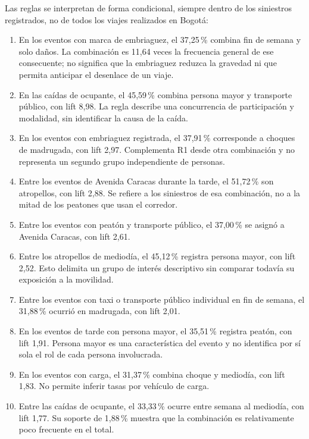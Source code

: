\documentclass[12pt,letterpaper]{article}
\begin{document}
Las reglas se interpretan de forma condicional, siempre dentro de los
siniestros registrados, no de todos los viajes realizados en Bogotá:
\begin{enumerate}[label=\textbf{R\arabic*.},leftmargin=*,itemsep=5pt]
\item En los eventos con marca de embriaguez, el 37,25\,\% combina
fin de semana y solo daños. La combinación es 11,64 veces la frecuencia
general de ese consecuente; no significa que la embriaguez reduzca la
gravedad ni que permita anticipar el desenlace de un viaje.
\item En las caídas de ocupante, el 45,59\,\% combina persona mayor y
transporte público, con lift 8,98. La regla describe una concurrencia de
participación y modalidad, sin identificar la causa de la caída.
\item En los eventos con embriaguez registrada, el 37,91\,\% corresponde
a choques de madrugada, con lift 2,97. Complementa R1 desde otra
combinación y no representa un segundo grupo independiente de personas.
\item Entre los eventos de Avenida Caracas durante la tarde,
el 51,72\,\% son atropellos, con lift 2,88. Se refiere a los siniestros
de esa combinación, no a la mitad de los peatones que usan el corredor.
\item Entre los eventos con peatón y transporte público, el
37,00\,\% se asignó a Avenida Caracas, con lift 2,61.
\item Entre los atropellos de mediodía, el 45,12\,\% registra persona
mayor, con lift 2,52. Esto delimita un grupo de interés descriptivo sin
comparar todavía su exposición a la movilidad.
\item Entre los eventos con taxi o transporte público individual en
fin de semana, el 31,88\,\% ocurrió en madrugada, con lift 2,01.
\item En los eventos de tarde con persona mayor, el 35,51\,\% registra
peatón, con lift 1,91. Persona mayor es una característica del evento
y no identifica por sí sola el rol de cada persona involucrada.
\item En los eventos con carga, el 31,37\,\% combina choque y
mediodía, con lift 1,83. No permite inferir tasas por vehículo de carga.
\item Entre las caídas de ocupante, el 33,33\,\% ocurre entre semana
al mediodía, con lift 1,77. Su soporte de 1,88\,\% muestra que la
combinación es relativamente poco frecuente en el total.
\end{enumerate}
\end{document}
